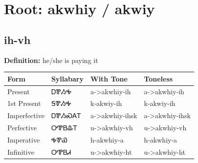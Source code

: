 \documentclass{article}%
\begin{document}
%
\normalsize%
\section*{Root: akwhiy / akwiy}%
\subsection*{ih-vh}%
\textbf{Definition: }%
he/she is paying it%
\\[0.5em]%
\begin{tabular}{|l|l|l|l|}%
\hline%
\textbf{Form}&\textbf{Syllabary}&\textbf{With Tone}&\textbf{Toneless}\\%
\hline%
Present&ᎠᏈᏱᎭ&a{-}>akwhiy{-}ih&a{-}>akwhiy{-}ih\\%
1st Present&ᎦᏈᏱᎭ&k{-}akwiy{-}ih&k{-}akwiy{-}ih\\%
Imperfective&ᎠᏈᏱᏍᎪᎢ&a{-}>akwhiy{-}ihsk&a{-}>akwhiy{-}ihsk\\%
Perfective&ᎤᏈᏴᎲᎢ&u{-}>akwhiy{-}vh&u{-}>akwhiy{-}vh\\%
Imperative&ᎭᏈᏯ&h{-}akwhiy{-}a&h{-}akwhiy{-}a\\%
Infinitive&ᎤᏈᏴᏗ&u{-}>akwhiy{-}ht&u{-}>akwhiy{-}ht\\%
\hline%
\end{tabular}%
\\[1em]%
\end{document}

